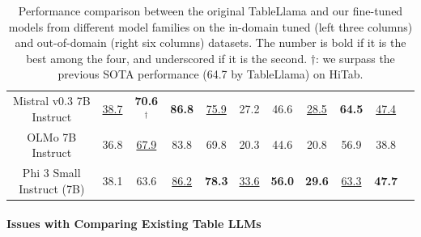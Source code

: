 \documentclass[11pt]{article}
\begin{document}
\begin{table}[t]
{\begin{tabular}{c|ccc|ccccccc}
\multicolumn{1}{c|}{Mistral v0.3 7B Instruct}  & \underline{38.7} & \textbf{70.6}$^\dagger$ & \textbf{86.8} & \underline{75.9} & 27.2 & 46.6 & \underline{28.5} & \textbf{64.5} & \underline{47.4}\\
\multicolumn{1}{c|}{OLMo 7B Instruct} & 36.8 & \underline{67.9} & 83.8 & 69.8 & 20.3 & 44.6 & 20.8 & 56.9 & 38.8 \\
\multicolumn{1}{c|}{Phi 3 Small Instruct (7B)} & 38.1 & 63.6 & \underline{86.2} & \textbf{78.3} & \underline{33.6} & \textbf{56.0} & \textbf{29.6} & \underline{63.3} & \textbf{47.7} \\

    \bottomrule
    \end{tabular}
    }
    \caption{Performance comparison between the original TableLlama and our fine-tuned models from different model families on the in-domain tuned (left three columns) and out-of-domain (right six columns) datasets.
    The number is bold if it is the best among the four, and underscored if it is the second.
    $\dagger$: we surpass the previous SOTA performance (64.7 by TableLlama) on HiTab.
    }
    \label{tab:mistral-tablellama}
\end{table}

\paragraph{Issues with Comparing Existing Table LLMs}


\end{document}
